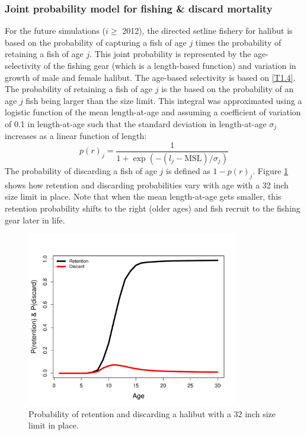\subsubsection{Joint probability model for fishing \& discard mortality} %
\label{ssub:joint_probability_for_fishing_&_discard_mortality}
For the future simulations ($i\geq$ 2012), the directed setline fishery for halibut is based on the probability of capturing a fish of age $j$ times the probability of retaining a fish of age $j$.  This joint probability is represented by the age-selectivity of the fishing gear (which is a length-based function) and variation in growth of male and female halibut.  The age-based selectivity is based on \eqref{T1.4}.  The probability of retaining a fish of age $j$ is the based on the probability of an age $j$ fish being larger than the size limit. This integral was approximated using a logistic function of the mean length-at-age and assuming a coefficient of variation of 0.1 in length-at-age such that the standard deviation in length-at-age $\sigma_j$ increases as a linear function of length:
\[
p(r)_j = \frac{1}{1+\exp(-(l_j-\mathrm{MSL})/\sigma_j)}
 \] 
The probability of discarding a fish of age $j$ is defined as $1-p(r)_j$.  Figure \ref{fig:FIGURES_SIZELIMIT_SelRetA} shows how retention and discarding probabilities vary with age with a 32 inch size limit in place.  Note that when the mean length-at-age gets smaller, this retention probability shifts to the right (older ages) and fish recruit to the fishing gear later in life.
\begin{figure}[htbp]
	\centering
		\includegraphics[height=3in]{../FIGURES/SIZELIMIT/SelRetA.pdf}
	\caption{Probability of retention and discarding a  halibut with a 32 inch size limit in place.}
	\label{fig:FIGURES_SIZELIMIT_SelRetA}
\end{figure}

